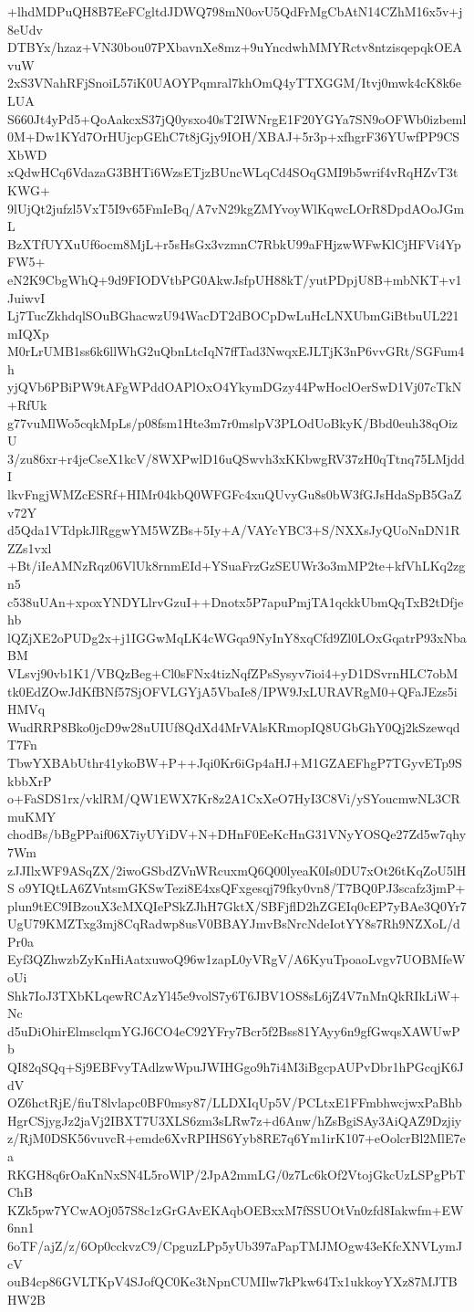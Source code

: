 +lhdMDPuQH8B7EeFCgltdJDWQ798mN0ovU5QdFrMgCbAtN14CZhM16x5v+j8eUdv
DTBYx/hzaz+VN30bou07PXbavnXe8mz+9uYncdwhMMYRctv8ntzisqepqkOEAvuW
2xS3VNahRFjSnoiL57iK0UAOYPqmral7khOmQ4yTTXGGM/Itvj0mwk4cK8k6eLUA
S660Jt4yPd5+QoAakcxS37jQ0ysxo40sT2IWNrgE1F20YGYa7SN9oOFWb0izbeml
0M+Dw1KYd7OrHUjcpGEhC7t8jGjy9IOH/XBAJ+5r3p+xfhgrF36YUwfPP9CSXbWD
xQdwHCq6VdazaG3BHTi6WzsETjzBUncWLqCd4SOqGMI9b5wrif4vRqHZvT3tKWG+
9lUjQt2jufzl5VxT5I9v65FmIeBq/A7vN29kgZMYvoyWlKqwcLOrR8DpdAOoJGmL
BzXTfUYXuUf6ocm8MjL+r5sHsGx3vzmnC7RbkU99aFHjzwWFwKlCjHFVi4YpFW5+
eN2K9CbgWhQ+9d9FIODVtbPG0AkwJsfpUH88kT/yutPDpjU8B+mbNKT+v1JuiwvI
Lj7TucZkhdqlSOuBGhacwzU94WacDT2dBOCpDwLuHcLNXUbmGiBtbuUL221mIQXp
M0rLrUMB1ss6k6llWhG2uQbnLtcIqN7ffTad3NwqxEJLTjK3nP6vvGRt/SGFum4h
yjQVb6PBiPW9tAFgWPddOAPlOxO4YkymDGzy44PwHoclOerSwD1Vj07cTkN+RfUk
g77vuMlWo5cqkMpLs/p08fsm1Hte3m7r0mslpV3PLOdUoBkyK/Bbd0euh38qOizU
3/zu86xr+r4jeCseX1kcV/8WXPwlD16uQSwvh3xKKbwgRV37zH0qTtnq75LMjddI
lkvFngjWMZcESRf+HIMr04kbQ0WFGFc4xuQUvyGu8s0bW3fGJsHdaSpB5GaZv72Y
d5Qda1VTdpkJlRggwYM5WZBs+5Iy+A/VAYcYBC3+S/NXXsJyQUoNnDN1RZZs1vxl
+Bt/iIeAMNzRqz06VlUk8rnmEId+YSuaFrzGzSEUWr3o3mMP2te+kfVhLKq2zgn5
c538uUAn+xpoxYNDYLlrvGzuI++Dnotx5P7apuPmjTA1qckkUbmQqTxB2tDfjehb
lQZjXE2oPUDg2x+j1IGGwMqLK4cWGqa9NyInY8xqCfd9Zl0LOxGqatrP93xNbaBM
VLsvj90vb1K1/VBQzBeg+Cl0sFNx4tizNqfZPsSysyv7ioi4+yD1DSvrnHLC7obM
tk0EdZOwJdKfBNf57SjOFVLGYjA5VbaIe8/IPW9JxLURAVRgM0+QFaJEzs5iHMVq
WudRRP8Bko0jcD9w28uUIUf8QdXd4MrVAlsKRmopIQ8UGbGhY0Qj2kSzewqdT7Fn
TbwYXBAbUthr41ykoBW+P++Jqi0Kr6iGp4aHJ+M1GZAEFhgP7TGyvETp9SkbbXrP
o+FaSDS1rx/vklRM/QW1EWX7Kr8z2A1CxXeO7HyI3C8Vi/ySYoucmwNL3CRmuKMY
chodBs/bBgPPaif06X7iyUYiDV+N+DHnF0EeKcHnG31VNyYOSQe27Zd5w7qhy7Wm
zJJIlxWF9ASqZX/2iwoGSbdZVnWRcuxmQ6Q00lyeaK0Is0DU7xOt26tKqZoU5lHS
o9YIQtLA6ZVntsmGKSwTezi8E4xsQFxgesqj79fky0vn8/T7BQ0PJ3scafz3jmP+
plun9tEC9IBzouX3cMXQIePSkZJhH7GktX/SBFjflD2hZGEIq0cEP7yBAe3Q0Yr7
UgU79KMZTxg3mj8CqRadwp8usV0BBAYJmvBsNrcNdeIotYY8s7Rh9NZXoL/dPr0a
Eyf3QZhwzbZyKnHiAatxuwoQ96w1zapL0yVRgV/A6KyuTpoaoLvgv7UOBMfeWoUi
Shk7IoJ3TXbKLqewRCAzYl45e9volS7y6T6JBV1OS8sL6jZ4V7nMnQkRIkLiW+Nc
d5uDiOhirElmsclqmYGJ6CO4eC92YFry7Bcr5f2Bss81YAyy6n9gfGwqsXAWUwPb
QI82qSQq+Sj9EBFvyTAdlzwWpuJWIHGgo9h7i4M3iBgcpAUPvDbr1hPGcqjK6JdV
OZ6hctRjE/fiuT8lvlapc0BF0msy87/LLDXIqUp5V/PCLtxE1FFmbhwcjwxPaBhb
HgrCSjygJz2jaVj2IBXT7U3XLS6zm3sLRw7z+d6Anw/hZsBgiSAy3AiQAZ9Dzjiy
z/RjM0DSK56vuvcR+emde6XvRPIHS6Yyb8RE7q6Ym1irK107+eOolcrBl2MlE7ea
RKGH8q6rOaKnNxSN4L5roWlP/2JpA2mmLG/0z7Lc6kOf2VtojGkcUzLSPgPbTChB
KZk5pw7YCwAOj057S8c1zGrGAvEKAqbOEBxxM7fSSUOtVn0zfd8Iakwfm+EW6nn1
6oTF/ajZ/z/6Op0cckvzC9/CpguzLPp5yUb397aPapTMJMOgw43eKfcXNVLymJcV
ouB4cp86GVLTKpV4SJofQC0Ke3tNpnCUMIlw7kPkw64Tx1ukkoyYXz87MJTBHW2B
